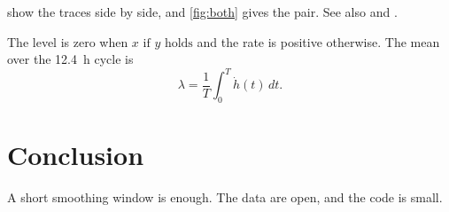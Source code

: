 \documentclass[11pt]{article}
\newcommand{\Rate}{\lambda}
\begin{document}
 show the traces side by side, and \cref{fig:both} gives
the pair. See also  and \citet{quay12}.

The level is zero when $x \text{ if $y$ holds}$ and the rate is positive otherwise.
The mean over the \SI{12.4}{\hour} cycle is
\begin{equation}\label{eq:rate}
  \Rate = \frac{1}{T}\int_0^T \dot{h}(t)\,dt .
\end{equation}

\section{Conclusion}
A short smoothing window is enough. The data are open, and the code is small.



\end{document}
